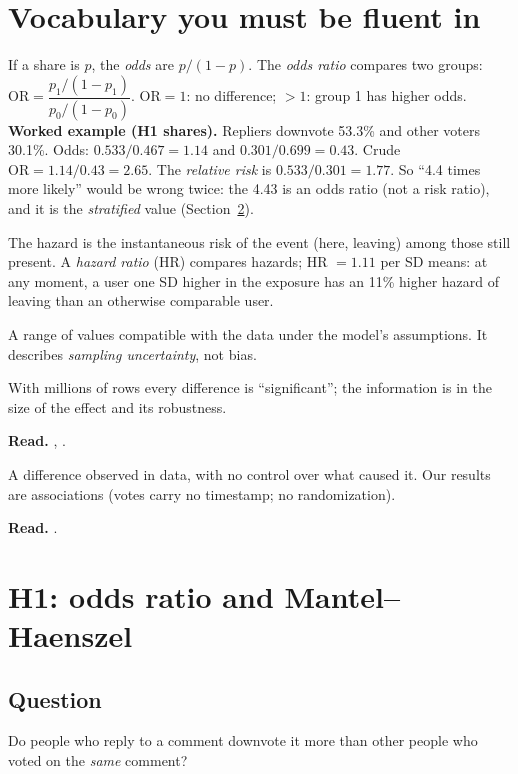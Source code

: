 \documentclass[11pt,a4paper]{article}
\newcommand{\readref}[1]{\par\textbf{Read.} #1}
\newcommand{\OR}{\mathrm{OR}}
\begin{document}
\section{Vocabulary you must be fluent in}\label{sec:vocab}
\begin{description}[style=nextline,leftmargin=0pt]
\item[Probability, odds, odds ratio.] If a share is $p$, the \emph{odds} are $p/(1-p)$. The \emph{odds ratio} compares two groups: $\OR=\dfrac{p_1/(1-p_1)}{p_0/(1-p_0)}$. $\OR=1$: no difference; $>1$: group 1 has higher odds.
\textbf{Worked example (H1 shares).} Repliers downvote 53.3\% and other voters 30.1\%. Odds: $0.533/0.467=1.14$ and $0.301/0.699=0.43$. Crude $\OR=1.14/0.43=2.65$. The \emph{relative risk} is $0.533/0.301=1.77$. So ``4.4 times more likely'' would be wrong twice: the 4.43 is an odds ratio (not a risk ratio), and it is the \emph{stratified} value (Section~\ref{sec:or}).
\item[Rate and hazard.] The hazard is the instantaneous risk of the event (here, leaving) among those still present. A \emph{hazard ratio} (HR) compares hazards; HR $=1.11$ per SD means: at any moment, a user one SD higher in the exposure has an 11\% higher hazard of leaving than an otherwise comparable user.
\item[Confidence interval (CI).] A range of values compatible with the data under the model's assumptions. It describes \emph{sampling uncertainty}, not bias.
\item[Effect size vs $p$-value.] With millions of rows every difference is ``significant''; the information is in the size of the effect and its robustness. \readref{\cite{wasserstein}, \cite{lin}.}
\item[Association vs causation.] A difference observed in data, with no control over what caused it. Our results are associations (votes carry no timestamp; no randomization). \readref{\cite{hernan}.}
\end{description}

\section{H1: odds ratio and Mantel--Haenszel}\label{sec:or}
\subsection*{Question}
Do people who reply to a comment downvote it more than other people who voted on the \emph{same} comment?
\end{document}
